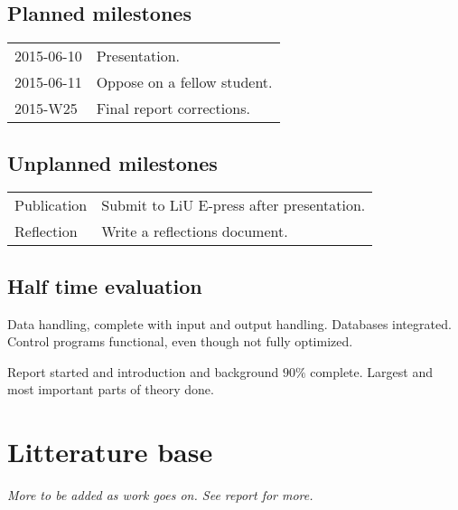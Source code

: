 \documentclass[11pt]{article}
\begin{document}
\subsection*{Planned milestones}

\begin{tabular}{l p{13cm}}
    2015-06-10  & Presentation. \\ %
    2015-06-11  & Oppose on a fellow student. \\ %
    2015-W25    & Final report corrections. \\
\end{tabular}

\subsection*{Unplanned milestones}

\begin{tabular}{l l}
    Publication & Submit to LiU E-press after presentation. \\
    Reflection  & Write a reflections document. \\
\end{tabular}

\subsection*{Half time evaluation}

Data handling, complete with input and output handling. Databases integrated. Control programs functional, even though not fully optimized.

Report started and introduction and background $90\%$ complete. Largest and most important parts of theory done.

\newpage


\section*{Litterature base}

\textit{More to be added as work goes on. See report for more.}
\end{document}
